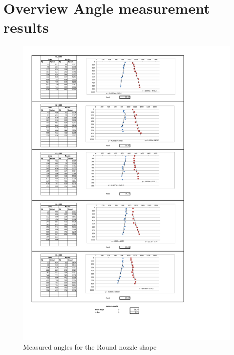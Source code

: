\chapter{Overview Angle measurement results}
\label{app:Angles}


\begin{figure}[ht]
    \centering
    \includegraphics[width=\linewidth]{Images/Roundt100.pdf}
    \caption{Measured angles for the Round nozzle shape}
\end{figure}

